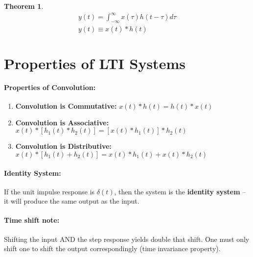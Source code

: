 \documentclass[a4paper,12pt]{report}
\newtheorem{theorem}{Theorem}
\begin{document}
\begin{theorem}
\begin{equation}
\begin{split}
y(t) = \int_{-\infty}^{\infty} x(\tau)h(t-\tau) d\tau \\
y(t) \equiv x(t) * h(t)
\end{split}
\end{equation}
\end{theorem}



\section{Properties of LTI Systems}

\paragraph{Properties of Convolution: } 
\begin{enumerate}
\item \textbf{Convolution is Commutative: } $x(t)*h(t) = h(t)*x(t)$
\item \textbf{Convolution is Associative: } $x(t)*[h_1(t)*h_2(t)] = [x(t)*h_1(t)]*h_2(t)$
\item \textbf{Convolution is Distributive: } $x(t)*[h_1(t) + h_2(t)] = x(t)*h_1(t) + x(t)*h_2(t)$
\end{enumerate}

\paragraph{Identity System: } If the unit impulse response is $\delta(t)$, then the system is the \textbf{identity system} -- it will produce the same output as the input.

\paragraph{Time shift note: } Shifting the input AND the step response yields double that shift. One must only shift one to shift the output correspondingly (time invariance property).
\end{document}
